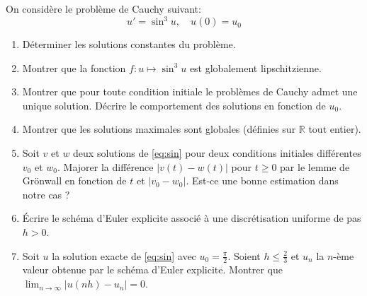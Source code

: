 \documentclass[a4paper,12pt,reqno]{amsart}
\begin{document}
\begin{exo}

  On considère le problème de Cauchy suivant:
    \begin{equation}\label{eq:sin}
      u'=\sin^3 u, \quad u(0)=u_{0}
    \end{equation}
  \begin{enumerate}
    \item Déterminer les solutions constantes du problème.
    \item Montrer que la fonction $f:u\mapsto \sin^3u$ est globalement lipschitzienne.
    \item Montrer que pour toute condition initiale le problèmes de Cauchy admet une unique solution. Décrire le comportement des solutions en fonction de $u_{0}$.
    \item Montrer que les solutions maximales sont globales (définies sur $\mathbb{R}$ tout entier).
    \item Soit $v$ et $w$ deux solutions de \eqref{eq:sin} pour deux conditions initiales différentes $v_{0}$ et $w_{0}$. Majorer la différence $|v(t)-w(t)|$ pour $t\geq 0$ par le lemme de Grönwall en fonction de $t$ et $|v_{0}-w_{0}|$. Est-ce une bonne estimation dans notre cas ?
    \item Écrire le schéma d'Euler explicite associé à une discrétisation uniforme de pas $h > 0$.
    \item Soit $u$ la solution exacte de \eqref{eq:sin} avec $u_{0} = \frac{\pi}{2}$. Soient $h \leq \frac{2}{3}$ et $u_{n}$ la $n$-ème valeur obtenue par le schéma d'Euler explicite. Montrer que $\lim_{n \rightarrow \infty}|u(nh)-u_{n}|=0$.

  \end{enumerate}
\end{exo}
\end{document}

